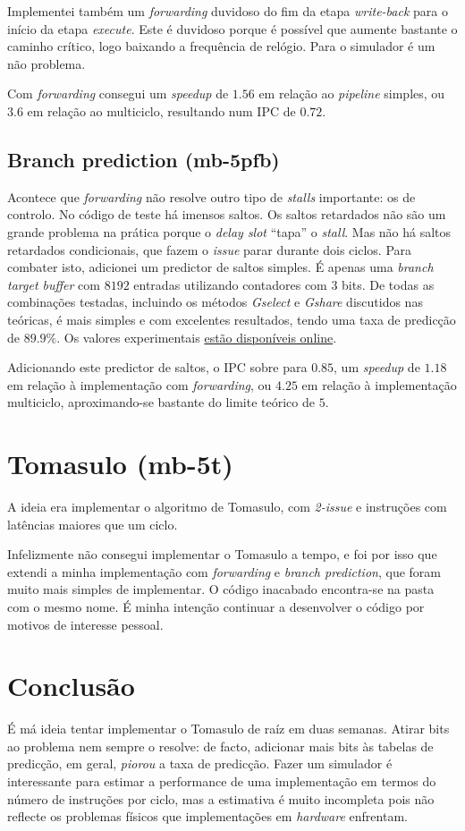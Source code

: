 \documentclass[]{IEEEtran}
\begin{document}
Implementei também um \emph{forwarding} duvidoso do fim da etapa
\emph{write-back} para o início da etapa \emph{execute}. Este é duvidoso porque
é possível que aumente bastante o caminho crítico, logo baixando a frequência de
relógio. Para o simulador é um não problema.

Com \emph{forwarding} consegui um \emph{speedup} de $1.56$ em relação ao
\emph{pipeline} simples, ou $3.6$ em relação ao multiciclo, resultando num IPC
de $0.72$.

\subsection{Branch prediction (mb-5pfb)}

Acontece que \emph{forwarding} não resolve outro tipo de \emph{stalls}
importante: os de controlo. No código de teste há imensos saltos. Os saltos
retardados não são um grande problema na prática porque o \emph{delay slot}
``tapa'' o \emph{stall}. Mas não há saltos retardados condicionais, que fazem o
\emph{issue} parar durante dois ciclos. Para combater isto, adicionei um
predictor de saltos simples. É apenas uma \emph{branch target buffer} com
$8192$ entradas utilizando contadores com 3 bits. De todas as combinações
testadas, incluindo os métodos \emph{Gselect} e \emph{Gshare} discutidos nas
teóricas, é mais simples e com excelentes resultados, tendo uma taxa de
predicção de $89.9\%$. Os valores experimentais \href{https://docs.google.com/spreadsheets/d/1Z5oacao_TFt442GxHCD_SurkacND7Wf3-Jv9VGI58fY/edit?usp=sharing}{estão disponíveis online}.

Adicionando este predictor de saltos, o IPC sobre para $0.85$, um \emph{speedup}
de $1.18$ em relação à implementação com \emph{forwarding}, ou $4.25$ em
relação à implementação multiciclo, aproximando-se bastante do limite teórico
de $5$.

\section{Tomasulo (mb-5t)}

A ideia era implementar o algoritmo de Tomasulo, com \emph{2-issue} e instruções
com latências maiores que um ciclo.

Infelizmente não consegui implementar o Tomasulo a tempo, e foi por isso que
extendi a minha implementação com \emph{forwarding} e \emph{branch prediction},
que foram muito mais simples de implementar. O código inacabado encontra-se na
pasta com o mesmo nome. É minha intenção continuar a desenvolver o código por
motivos de interesse pessoal.

\section{Conclusão}

É má ideia tentar implementar o Tomasulo de raíz em duas semanas. Atirar bits
ao problema nem sempre o resolve: de facto, adicionar mais bits às tabelas de
predicção, em geral, \emph{piorou} a taxa de predicção. Fazer um simulador é
interessante para estimar a performance de uma implementação em termos do número
de instruções por ciclo, mas a estimativa é muito incompleta pois não reflecte
os problemas físicos que implementações em \emph{hardware} enfrentam.
\end{document}
